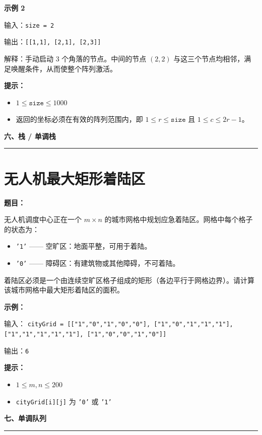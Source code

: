 \documentclass[12pt, a4paper]{article}
\newcommand{\category}[1]{%
  \vspace{1.2cm}
  {\noindent\Large\bfseries #1}
  \vspace{0.2em}\par
  \noindent\rule{\textwidth}{0.8pt}
  \vspace{0.2em}
}
\begin{document}
\textbf{示例 2}

输入：\texttt{size = 2}

输出：\texttt{[[1,1], [2,1], [2,3]]}

解释：手动启动 3 个角落的节点。中间的节点 $(2,2)$ 与这三个节点均相邻，满足唤醒条件，从而使整个阵列激活。

\textbf{提示：}
\begin{itemize}[leftmargin=2em]
  \item $1 \leq \texttt{size} \leq 1000$
  \item 返回的坐标必须在有效的阵列范围内，即 $1 \leq r \leq \texttt{size}$ 且 $1 \leq c \leq 2r - 1$。
\end{itemize}



\category{六、栈 / 单调栈}

\section{无人机最大矩形着陆区}

\noindent\textbf{题目：}

无人机调度中心正在一个 $m \times n$ 的城市网格中规划应急着陆区。网格中每个格子的状态为：
\begin{itemize}[leftmargin=2em]
  \item \texttt{'1'} —— 空旷区：地面平整，可用于着陆。
  \item \texttt{'0'} —— 障碍区：有建筑物或其他障碍，不可着陆。
\end{itemize}

着陆区必须是一个由连续空旷区格子组成的矩形（各边平行于网格边界）。请计算该城市网格中最大矩形着陆区的面积。

\textbf{示例：}

输入：
\texttt{cityGrid = [["1","0","1","0","0"], ["1","0","1","1","1"], ["1","1","1","1","1"], ["1","0","0","1","0"]]}

输出：\texttt{6}

\textbf{提示：}
\begin{itemize}[leftmargin=2em]
  \item $1 \leq m, n \leq 200$
  \item \texttt{cityGrid[i][j]} 为 \texttt{'0'} 或 \texttt{'1'}
\end{itemize}



\category{七、单调队列}
\end{document}
